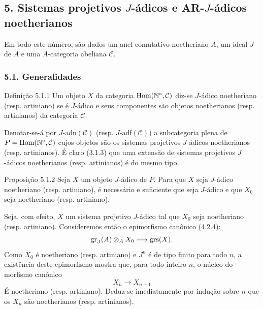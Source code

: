 \subsection*{5. Sistemas projetivos \(J\)-ádicos e AR-\(J\)-ádicos noetherianos}

Em todo este número, são dados um anel comutativo noetheriano \(A\), um ideal \(J\) de \(A\) e uma \(A\)-categoria abeliana \(\mathcal C\).

\subsubsection*{5.1. Generalidades}

\begin{statement}{Definição 5.1.1}
Um objeto \(X\) da categoria \(\operatorname{Hom}(\mathbb N^\circ,\mathcal C)\) diz-se \(J\)-ádico noetheriano (resp. artiniano) se é \(J\)-ádico e seus componentes são objetos noetherianos (resp. artinianos) da categoria \(\mathcal C\).
\end{statement}

Denotar-se-á por \(J\)-adn\((\mathcal C)\) (resp. \(J\)-adf\((\mathcal C)\)) a subcategoria plena de
\(P=\operatorname{Hom}(\mathbb N^\circ,\mathcal C)\) cujos objetos são os sistemas projetivos \(J\)-ádicos noetherianos (resp. artinianos). É claro (3.1.3) que uma extensão de sistemas projetivos \(J\)-ádicos noetherianos (resp. artinianos) é do mesmo tipo.

\begin{statement}{Proposição 5.1.2}
Seja \(X\) um objeto \(J\)-ádico de \(P\). Para que \(X\) seja \(J\)-ádico noetheriano (resp. artiniano), é necessário e suficiente que seja \(J\)-ádico e que \(X_0\) seja noetheriano (resp. artiniano).
\end{statement}

\begin{prooftext}
Seja, com efeito, \(X\) um sistema projetivo \(J\)-ádico tal que \(X_0\) seja noetheriano (resp. artiniano). Consideremos então o epimorfismo canônico (4.2.4):
\[
\operatorname{gr}_J(A)\otimes_A X_0\longrightarrow \operatorname{grs}(X).
\]
Como \(X_0\) é noetheriano (resp. artiniano) e \(J^n\) é de tipo finito para todo \(n\), a existência deste epimorfismo mostra que, para todo inteiro \(n\), o núcleo do morfismo canônico
\[
X_n\longrightarrow X_{n-1}
\]
É noetheriano (resp. artiniano). Deduz-se imediatamente por indução sobre \(n\) que os \(X_n\) são noetherianos (resp. artinianos).
\end{prooftext}

